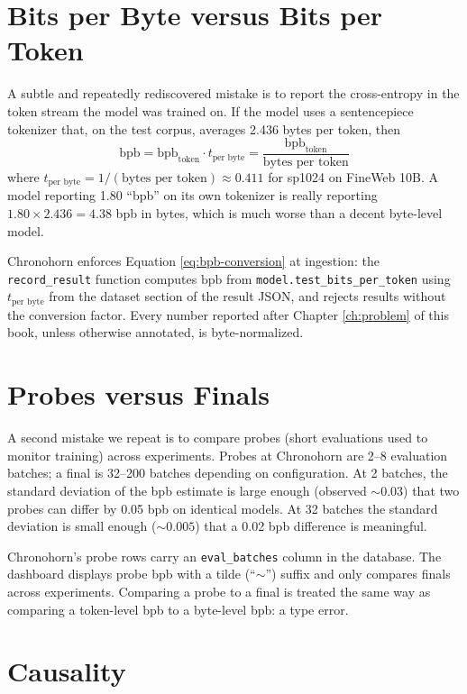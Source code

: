 \documentclass[11pt,openany]{book}
\theoremstyle{definition}
\theoremstyle{plain}
\newcommand{\bpb}{\text{bpb}}
\newcommand{\tokpb}{t_{\text{per byte}}}
\begin{document}
\section{Bits per Byte versus Bits per Token}

A subtle and repeatedly rediscovered mistake is to report the cross-entropy
in the token stream the model was trained on. If the model uses a
sentencepiece tokenizer that, on the test corpus, averages 2.436 bytes per
token, then
\begin{equation}
  \bpb = \bpb_{\text{token}} \cdot \tokpb = \frac{\bpb_{\text{token}}}{\text{bytes per token}}
  \label{eq:bpb-conversion}
\end{equation}
where $\tokpb = 1 / (\text{bytes per token}) \approx 0.411$ for sp1024 on
FineWeb 10B. A model reporting 1.80 ``bpb'' on its own tokenizer is really
reporting $1.80 \times 2.436 = 4.38$ bpb in bytes, which is much worse than
a decent byte-level model.

Chronohorn enforces Equation \ref{eq:bpb-conversion} at ingestion: the
\texttt{record\_result} function computes $\bpb$ from
\texttt{model.test\_bits\_per\_token} using $\tokpb$ from the dataset
section of the result JSON, and rejects results without the conversion
factor. Every number reported after Chapter \ref{ch:problem} of this book,
unless otherwise annotated, is byte-normalized.

\section{Probes versus Finals}

A second mistake we repeat is to compare probes (short evaluations used to
monitor training) across experiments. Probes at Chronohorn are 2--8
evaluation batches; a final is 32--200 batches depending on configuration.
At 2 batches, the standard deviation of the bpb estimate is large enough
(observed $\sim 0.03$) that two probes can differ by 0.05 bpb on identical
models. At 32 batches the standard deviation is small enough ($\sim 0.005$)
that a 0.02 bpb difference is meaningful.

Chronohorn's probe rows carry an \texttt{eval\_batches} column in the database.
The dashboard displays probe bpb with a tilde (``$\sim$'') suffix and only
compares finals across experiments. Comparing a probe to a final is
treated the same way as comparing a token-level bpb to a byte-level bpb: a
type error.

\section{Causality}
\end{document}
